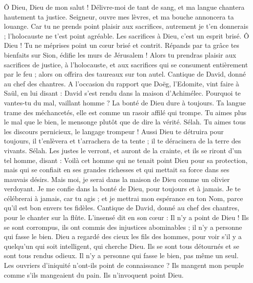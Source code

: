 \begin{multicols}{2}
Ô Dieu, Dieu de mon salut ! Délivre-moi de tant de sang, et ma langue chantera hautement ta justice.
Seigneur, ouvre mes lèvres, et ma bouche annoncera ta louange.
Car tu ne prends point plaisir aux sacrifices, autrement je t'en donnerais ; l'holocauste ne t'est point agréable.
Les sacrifices à Dieu, c'est un esprit brisé. Ô Dieu ! Tu ne méprises point un cœur brisé et contrit.
Répands par ta grâce tes bienfaits sur Sion, édifie les murs de Jérusalem !
Alors tu prendras plaisir aux sacrifices de justice, à l'holocauste, et aux sacrifices qui se consument entièrement par le feu ; alors on offrira des taureaux sur ton autel.
\VerseOne{}Cantique de David, donné au chef des chantres.
A l'occasion du rapport que Doëg, l'Edomite, vint faire à Saül, en lui disant : David s'est rendu dans la maison d'Achimélec.
Pourquoi te vantes-tu du mal, vaillant homme ? La bonté de Dieu dure à toujours.
Ta langue trame des méchancetés, elle est comme un rasoir affilé qui trompe.
Tu aimes plus le mal que le bien, le mensonge plutôt que de dire la vérité. Sélah.
Tu aimes tous les discours pernicieux, le langage trompeur !
Aussi Dieu te détruira pour toujours, il t'enlèvera et t'arrachera de ta tente ; il te déracinera de la terre des vivants. Sélah.
Les justes le verront, et auront de la crainte, et ils se riront d'un tel homme, disant :
Voilà cet homme qui ne tenait point Dieu pour sa protection, mais qui se confiait en ses grandes richesses et qui mettait sa force dans ses mauvais désirs.
Mais moi, je serai dans la maison de Dieu comme un olivier verdoyant. Je me confie dans la bonté de Dieu, pour toujours et à jamais.
Je te célébrerai à jamais, car tu agis ; et je mettrai mon espérance en ton Nom, parce qu'il est bon envers tes fidèles.
\VerseOne{}Cantique de David, donné au chef des chantres, pour le chanter sur la flûte.
L'insensé dit en son cœur : Il n'y a point de Dieu ! Ils se sont corrompus, ils ont commis des injustices abominables ; il n'y a personne qui fasse le bien.
Dieu a regardé des cieux les fils des hommes, pour voir s'il y a quelqu'un qui soit intelligent, qui cherche Dieu.
Ils se sont tous détournés et se sont tous rendus odieux. Il n'y a personne qui fasse le bien, pas même un seul.
Les ouvriers d'iniquité n'ont-ils point de connaissance ? Ils mangent mon peuple comme s'ils mangeaient du pain. Ils n'invoquent point Dieu.

\end{multicols}

